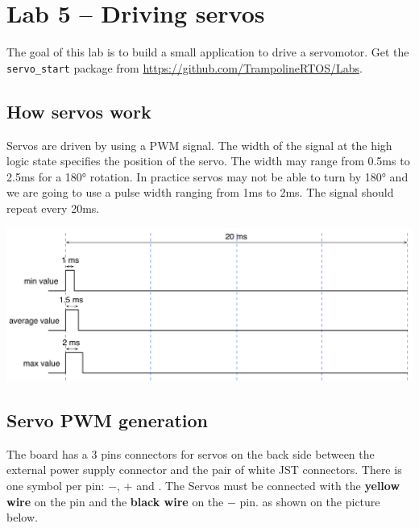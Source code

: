 \documentclass[11pt]{report}
\begin{document}
\chapter{Lab 5 -- Driving servos}

The goal of this lab is to build a small application to drive a servomotor. Get the \texttt{servo_start} package from \url{https://github.com/TrampolineRTOS/Labs}.

\section{How servos work}

Servos are driven by using a PWM signal. The width of the signal at the high logic state specifies the position of the servo. The width may range from 0.5ms to 2.5ms for a 180° rotation. In practice servos may not be able to turn by 180° and we are going to use a pulse width ranging from 1ms to 2ms. The signal should repeat every 20ms.

\includegraphics[width=\textwidth]{img/servopwm.pdf}

\section{Servo PWM generation}

The board has a 3 pins connectors for servos on the back side between the external power supply connector and the pair of white JST connectors. There is one symbol per pin: $-$, $+$ and . The Servos must be connected with the {\bf yellow wire} on the  pin and the {\bf black wire} on the $-$ pin. as shown on the picture below.
\end{document}

